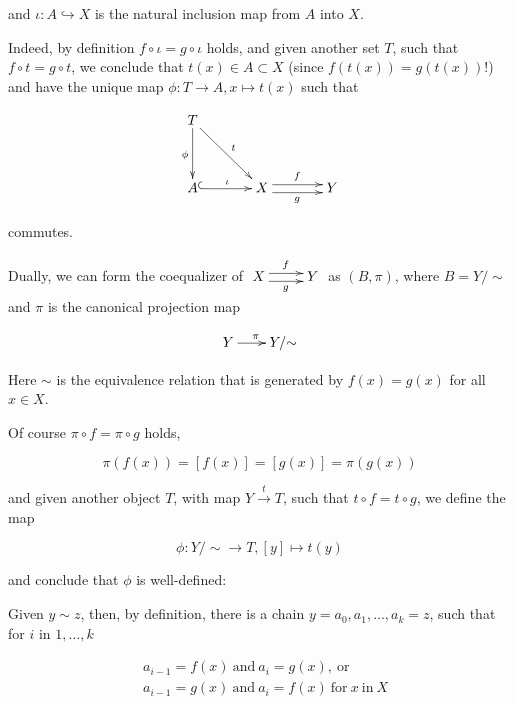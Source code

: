 \documentclass[a4paper]{amsart}            %
\theoremstyle{plain}                                               %
\begin{document}
and $\iota:A \hookrightarrow X$ is the natural inclusion map from $A$ into $X$.

Indeed, by definition $f \circ \iota = g \circ \iota$ holds, and given another set $T$, such that $f \circ t  = g \circ t$, we conclude that $t(x) \in A \subset X$ (since $f(t(x)) = g(t(x))$!) and have the unique map $\phi: T \rightarrow A, x \mapsto t(x)$ such that

\begin{align*}
\xymatrix@+=1.25cm{T \ar[d]_{\phi} \ar[rd]^t & & \\
									 A \ar@{^{(}->}[r]^{\iota} & X \ar@<0.66ex>[r]^f \ar@<-0.66ex>[r]_g & Y} 
\end{align*}

commutes.

\bigskip

Dually, we can form the coequalizer of $\xymatrix{X \ar@<0.66ex>[r]^f \ar@<-0.66ex>[r]_g & Y}$ as $(B, \pi)$, where $B = Y/{\sim}$ and $\pi$ is the canonical projection map 

\begin{equation*}
\xymatrix@=0.7cm{Y \ar[r]^{\pi} & Y/{\sim}}
\end{equation*}

Here $\sim$ is the equivalence relation that is generated by $f(x) = g(x)$ for all $x \in X$.

Of course $\pi \circ f = \pi \circ g$ holds, 

\begin{equation*}
\pi(f(x)) = [f(x)] = [g(x)] = \pi(g(x))
\end{equation*}

and given another object $T$, with map $Y \xrightarrow{t} T$, such that $t \circ f = t \circ g$, we define the map 

\begin{equation*}
\phi: Y/{\sim} \rightarrow T, [y] \mapsto t(y)
\end{equation*}

and conclude that $\phi$ is well-defined:

Given $y \sim z$, then, by definition, there is a chain $y=a_0,a_1,...,a_k=z$, such that for $i$ in ${1,...,k}$
	
\begin{align*}
&a_{i-1} = f(x) \mathrm{\ and} \ a_{i}=g(x), \mathrm{ \ or} \\
&a_{i-1} = g(x) \mathrm{\ and} \ a_{i}=f(x) \mathrm{\ for} \ x \mathrm{\ in} \ X
\end{align*}
\end{document}
